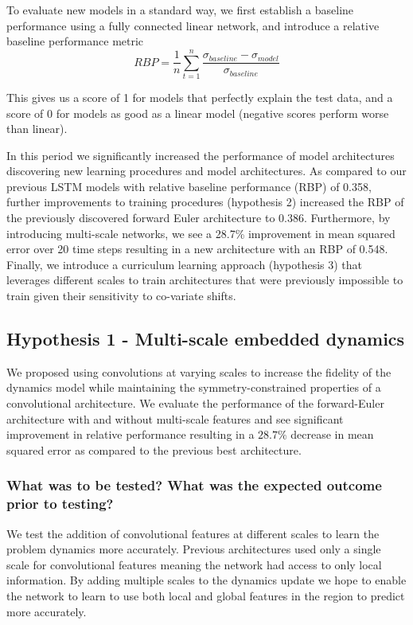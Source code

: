 \documentclass[12pt]{article}
\theoremstyle{plain}
\theoremstyle{remark}
\theoremstyle{definition}
\begin{document}
To evaluate new models in a standard way, we first establish a baseline performance using a fully connected linear network, and introduce a relative baseline performance metric 
$$RBP =  \frac{1}{n}\sum_{t=1}^{n}\frac{\sigma_{baseline} - \sigma_{model}}{ \sigma_{baseline}}$$ 

This gives us a score of 1 for models that perfectly explain the test data, and a score of 0 for models as good as a linear model (negative scores perform worse than linear).

In this period we significantly increased the performance of model architectures discovering new learning procedures and model architectures. As compared to our previous LSTM models with relative baseline performance (RBP) of 0.358, further improvements to training procedures (hypothesis 2) increased the RBP of the previously discovered forward Euler architecture to 0.386. 
Furthermore, by introducing multi-scale networks, we see a 28.7\% improvement in mean squared error over 20 time steps resulting in a new architecture with an RBP of 0.548. Finally, we introduce a curriculum learning approach (hypothesis 3) that leverages different scales to train architectures that were previously impossible to train given their sensitivity to co-variate shifts. 


\subsection{Hypothesis 1 - Multi-scale embedded dynamics}

We proposed using convolutions at varying scales to increase the fidelity of the dynamics model while maintaining the symmetry-constrained properties of a convolutional architecture. We evaluate the performance of the forward-Euler architecture with and without multi-scale features and see significant improvement in relative performance resulting in a $28.7\%$ decrease in mean squared error as compared to the previous best architecture.

\subsubsection{What was to be tested? What was the expected outcome prior to testing?}
	We test the addition of convolutional features at different scales to learn the problem dynamics more accurately. Previous architectures used only a single scale for convolutional features meaning the network had access to only local information. By adding multiple scales to the dynamics update we hope to enable the network to learn to use both local and global features in the region to predict more accurately.
\end{document}
